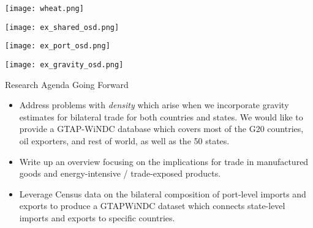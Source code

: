 \documentclass[10pt]{beamer}
\begin{document}
\begin{frame}{}
\texttt{[image: wheat.png]}
\end{frame}
\begin{frame}{}
\texttt{[image: ex\_shared\_osd.png]}
\end{frame}
\begin{frame}{}
\texttt{[image: ex\_port\_osd.png]}
\end{frame}
\begin{frame}{}
\texttt{[image: ex\_gravity\_osd.png]}
\end{frame}

\begin{frame}{Research Agenda Going Forward}

\begin{itemize}

\item Address problems with \textit{density} which arise when we
incorporate gravity estimates for bilateral trade for both countries
and states. We would like to provide a GTAP-WiNDC database which
covers most of the G20 countries, oil exporters, and rest of world, as
well as the 50 states. 

\item	Write up an overview focusing on the implications for trade in
manufactured goods and energy-intensive / trade-exposed products.

\item Leverage Census data on the bilateral composition of port-level
imports and exports to produce a GTAPWiNDC dataset which connects
state-level imports and exports to specific countries.

\end{itemize}

\end{frame}
\end{document}
